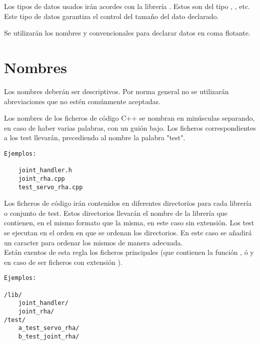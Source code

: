 Los tipos de datos usados irán acordes con la librería . Estos son del tipo , , etc. Este tipo de datos garantiza el control del tamaño del dato declarado.

Se utilizarán los nombres  y  convencionales para declarar datos en coma flotante.

\section{Nombres}\label{sec:codificacionSW:nombres}


Los nombres deberán ser descriptivos. Por norma general no se utilizarán abreviaciones que no estén comúnmente aceptadas.


    Los nombres de los ficheros de código C++ se nombran en minúsculas separando, en caso de haber varias palabras, con un guión bajo. Los ficheros correspondientes a los test llevarán, precediendo al nombre la palabra "test".
    \\ 
    
    \lstset{language=C, breaklines=true, basicstyle=\footnotesize}
        \begin{lstlisting}[frame=single]
Ejemplos:

    joint_handler.h
    joint_rha.cpp
    test_servo_rha.cpp
    \end{lstlisting}


    Los ficheros de código irán contenidos en diferentes directorios para cada librería o conjunto de test. Estos directorios llevarán el nombre de la librería que contienen, en el mismo formato que la misma, en este caso sin extensión. Los test se ejecutan en el orden en que se ordenan los directorios. En este caso se añadirá un caracter para ordenar los mismos de manera adecuada. 
    \\ 
    
    Están exentos de esta regla los ficheros principales (que contienen la función , ó  y  en caso de ser ficheros con extensión ). 
    \\
    \lstset{language=C, breaklines=true, basicstyle=\footnotesize}
    \begin{lstlisting}[frame=single]
Ejemplos:

/lib/
    joint_handler/
    joint_rha/
/test/
    a_test_servo_rha/
    b_test_joint_rha/
    \end{lstlisting}

